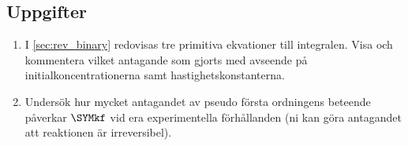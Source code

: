 \subsection{Uppgifter}
\begin{enumerate}
\item I \cref{sec:rev_binary} redovisas tre primitiva ekvationer till
integralen. Visa och kommentera vilket antagande som gjorts med avseende på
initialkoncentrationerna samt hastighetskonstanterna.
\item Undersök hur mycket antagandet av pseudo första ordningens beteende
  påverkar $\SYMkf$ vid era experimentella förhållanden (ni kan göra
  antagandet att reaktionen är irreversibel).
\end{enumerate}
